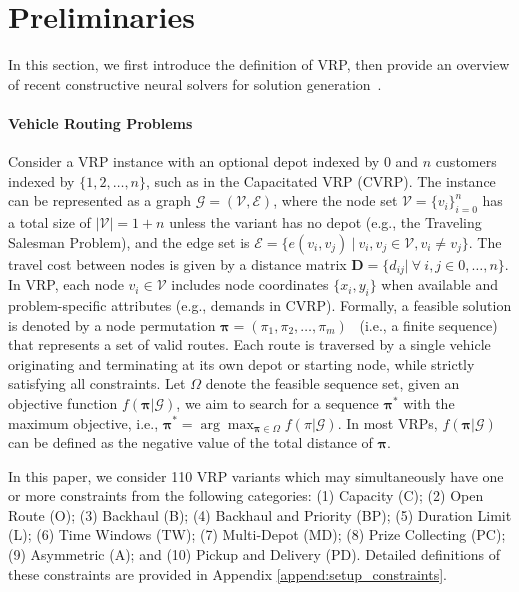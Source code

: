 \documentclass{article}
\theoremstyle{plain}
\theoremstyle{definition}
\theoremstyle{remark}
\begin{document}
\section{Preliminaries}
In this section, we first introduce the definition of VRP, then provide an overview of recent constructive neural solvers for solution generation~\citep{kool2019attention,kwon2020pomo}.

\paragraph{Vehicle Routing Problems}

Consider a VRP instance with an optional depot indexed by $0$ and $n$ customers indexed by $\{1, 2, \ldots, n\}$, such as in the Capacitated VRP (CVRP). The instance can be represented as a graph $\mathcal{G}=(\mathcal{V}, \mathcal{E})$, where the node set $\mathcal{V}=\{v_i\}_{i=0}^n$ has a total size of $|\mathcal{V}|=1+n$ unless the variant has no depot (e.g., the Traveling Salesman Problem), and the edge set is $\mathcal{E}=\{e(v_i,v_j)\ |\ v_i,v_j\in \mathcal{V}, v_i \neq v_j\} $. The travel cost between nodes is given by a distance matrix $\bm{D}=\{d_{ij}| \ \forall \  i,j \in 0, \ldots, n\}$. In VRP, each node $v_i \in \mathcal{V}$ includes node coordinates $\{x_{i},y_{i}\}$ when available and problem-specific attributes (e.g., demands in CVRP). Formally, a feasible solution is denoted by a node permutation $\bm{\pi} = (\pi_1, \pi_2, \ldots, \pi_m)$~\citep{toth2002vehicle} (i.e., a finite sequence) that represents a set of valid routes. Each route is traversed by a single vehicle originating and terminating at its own depot or starting node, while strictly satisfying all constraints. Let $\Omega$ denote the feasible sequence set, given an objective function $f(\bm{\pi} | \mathcal{G})$, we aim to search for a sequence $\bm{\pi}^*$ with the maximum objective, i.e., $\bm{\pi}^* = \arg\max_{\bm{\pi}\in \Omega} f(\pi|\mathcal{G})$. In most VRPs, $f(\bm{\pi} | \mathcal{G})$ can be defined as the negative value of the total distance of $\bm{\pi}$. 

In this paper, we consider 110 VRP variants which may simultaneously have one or more constraints from the following categories: (1) Capacity (C); (2) Open Route (O); (3) Backhaul (B); (4) Backhaul and Priority (BP); (5) Duration Limit (L); (6) Time Windows (TW); (7) Multi-Depot (MD); (8) Prize Collecting (PC); (9) Asymmetric (A); and (10) Pickup and Delivery (PD). Detailed definitions of these constraints are provided in Appendix \ref{append:setup_constraints}.
\end{document}
